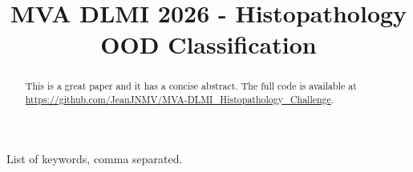 \documentclass{midl}
\title[Histopathology OOD Classification]{MVA DLMI 2026 - Histopathology OOD Classification}
\begin{document}
\maketitle

\begin{abstract}
This is a great paper and it has a concise abstract. The full code is available at \url{https://github.com/JeanJNMV/MVA-DLMI_Histopathology_Challenge}.
\end{abstract} 

\begin{keywords}
List of keywords, comma separated.
\end{keywords}
\end{document}
